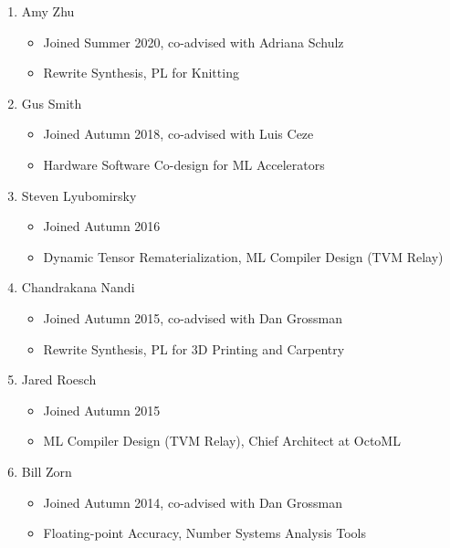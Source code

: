 \documentclass[10pt]{article}
\begin{document}
\begin{enumerate}
  \item Amy Zhu
    \begin{itemize}
      \item Joined Summer 2020, co-advised with Adriana Schulz
      \item Rewrite Synthesis, PL for Knitting
    \end{itemize}

  \item Gus Smith
    \begin{itemize}
      \item Joined Autumn 2018, co-advised with Luis Ceze
      \item Hardware Software Co-design for ML Accelerators
    \end{itemize}

  \item Steven Lyubomirsky
    \begin{itemize}
      \item Joined Autumn 2016
      \item Dynamic Tensor Rematerialization, ML Compiler Design (TVM Relay)
    \end{itemize}

  \item Chandrakana Nandi
    \begin{itemize}
      \item Joined Autumn 2015, co-advised with Dan Grossman
      \item Rewrite Synthesis, PL for 3D Printing and Carpentry
    \end{itemize}

  \item Jared Roesch
    \begin{itemize}
      \item Joined Autumn 2015
      \item ML Compiler Design (TVM Relay), Chief Architect at OctoML
    \end{itemize}

  \item Bill Zorn
    \begin{itemize}
      \item Joined Autumn 2014, co-advised with Dan Grossman
      \item Floating-point Accuracy, Number Systems Analysis Tools
    \end{itemize}
\end{enumerate}
\end{document}
